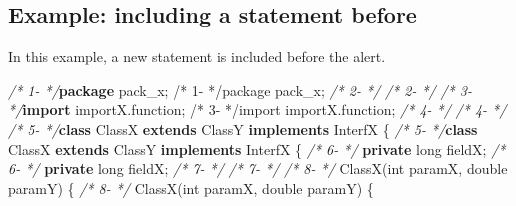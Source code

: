 \documentclass[
]{article}
\newenvironment{Shaded}{\begin{snugshade}}{\end{snugshade}}
\newcommand{\CommentTok}[1]{\textcolor[rgb]{0.56,0.35,0.01}{\textit{#1}}}
\newcommand{\DataTypeTok}[1]{\textcolor[rgb]{0.13,0.29,0.53}{#1}}
\newcommand{\FunctionTok}[1]{\textcolor[rgb]{0.00,0.00,0.00}{#1}}
\newcommand{\ImportTok}[1]{#1}
\newcommand{\KeywordTok}[1]{\textcolor[rgb]{0.13,0.29,0.53}{\textbf{#1}}}
\newcommand{\NormalTok}[1]{#1}
\begin{document}
\begin{landscape}

\subsection{Example: including a statement before} \label{example_including_statement}

\small

\normalsize

In this example, a new statement is included before the alert.

\small

\normalsize

\scriptsize

\begin{Shaded}
\begin{Highlighting}[]
\CommentTok{/*  1-                 */}\KeywordTok{package}\ImportTok{ pack_x;                                                /*  1-                 */package pack_x;}                                                
\CommentTok{/*  2-                 */}                                                               \CommentTok{/*  2-                 */}                                                               
\CommentTok{/*  3-                 */}\KeywordTok{import}\ImportTok{ importX.function;                                       /*  3-                 */import importX.function;}                                       
\CommentTok{/*  4-                 */}                                                               \CommentTok{/*  4-                 */}                                                               
\CommentTok{/*  5-                 */}\KeywordTok{class}\NormalTok{ ClassX }\KeywordTok{extends}\NormalTok{ ClassY }\KeywordTok{implements}\NormalTok{ InterfX \{               }\CommentTok{/*  5-                 */}\KeywordTok{class}\NormalTok{ ClassX }\KeywordTok{extends}\NormalTok{ ClassY }\KeywordTok{implements}\NormalTok{ InterfX \{               }
\CommentTok{/*  6-                 */}    \KeywordTok{private} \DataTypeTok{long}\NormalTok{ fieldX;                                       }\CommentTok{/*  6-                 */}    \KeywordTok{private} \DataTypeTok{long}\NormalTok{ fieldX;                                       }
\CommentTok{/*  7-                 */}                                                               \CommentTok{/*  7-                 */}                                                               
\CommentTok{/*  8-                 */}    \FunctionTok{ClassX}\NormalTok{(}\DataTypeTok{int}\NormalTok{ paramX, }\DataTypeTok{double}\NormalTok{ paramY) \{                                }\CommentTok{/*  8-                 */}    \FunctionTok{ClassX}\NormalTok{(}\DataTypeTok{int}\NormalTok{ paramX, }\DataTypeTok{double}\NormalTok{ paramY) \{                                }

\end{Highlighting}
\end{Shaded}
\end{landscape}
\end{document}
